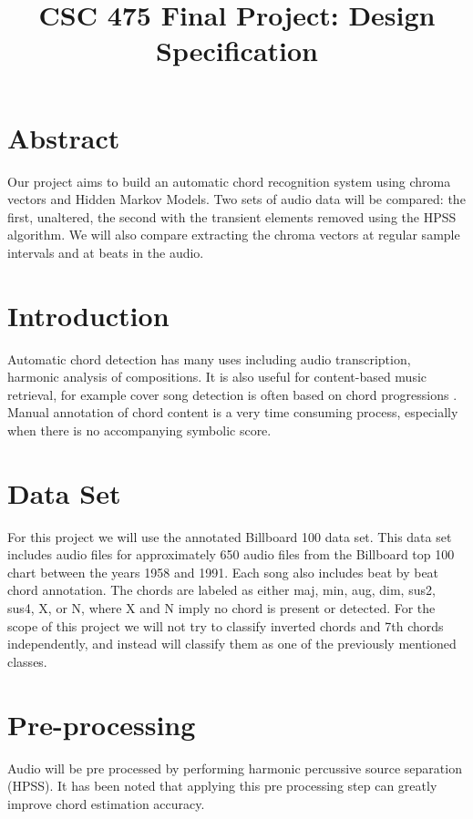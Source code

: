 \documentclass{article}
\title{CSC 475 Final Project: Design Specification}
\begin{document}
%
\maketitle
%

\section{Abstract}\label{sec:desoutline}
Our project aims to build an automatic chord recognition system using chroma
vectors and Hidden Markov Models. Two sets of audio data will be compared: the
first, unaltered, the second with the transient elements removed using the HPSS
algorithm. We will also compare extracting the chroma vectors at regular sample
intervals and at beats in the audio.

\section{Introduction}\label{sec:intro}

Automatic chord detection has many uses including audio transcription, harmonic
analysis of compositions. It is also useful for content-based music retrieval,
for example cover song detection is often based on chord progressions
\cite{Papadopoulos:18}.  Manual annotation of chord content is a very time
consuming process, especially when there is no accompanying symbolic score.

\section{Data Set}

For this project we will use the annotated Billboard 100 data set. This data
set includes audio files for approximately 650 audio files from the Billboard
top 100 chart between the years 1958 and 1991. Each song also includes beat by
beat chord annotation\cite{Burgoyne:07}. The chords are labeled as either maj,
min, aug, dim, sus2, sus4, X, or N, where X and N imply no chord is present or
detected.  For the scope of this project we will not try to classify inverted
chords and 7th chords independently, and instead will classify them as one of
the previously mentioned classes.

\section{Pre-processing}
Audio will be pre processed by performing harmonic percussive source separation
(HPSS). It has been noted that applying this pre processing step can greatly
improve chord estimation accuracy\cite{Reed:09}.
\end{document}

